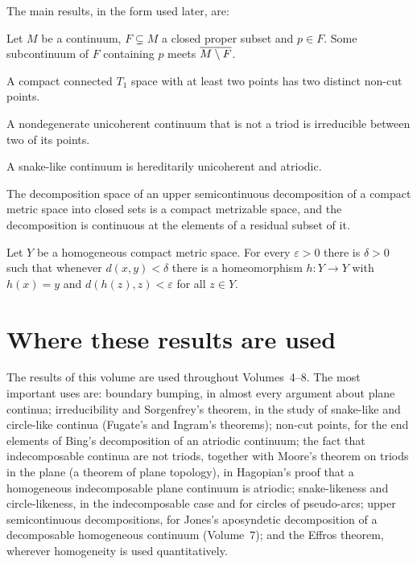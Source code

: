 The main results, in the form used later, are:

\begin{theorem}
Let $M$ be a continuum, $F\subsetneq M$ a closed proper subset and $p\in F$. Some subcontinuum of
$F$ containing $p$ meets $\overline{M\setminus F}$.
\end{theorem}

\begin{theorem}
A compact connected $T_1$ space with at least two points has two distinct non-cut points.
\end{theorem}

\begin{theorem}
A nondegenerate unicoherent continuum that is not a triod is irreducible between two of its
points.
\end{theorem}

\begin{theorem}
A snake-like continuum is hereditarily unicoherent and atriodic.
\end{theorem}

\begin{theorem}
The decomposition space of an upper semicontinuous decomposition of a compact metric space into
closed sets is a compact metrizable space, and the decomposition is continuous at the elements of
a residual subset of it.
\end{theorem}

\begin{theorem}
Let $Y$ be a homogeneous compact metric space. For every $\varepsilon>0$ there is $\delta>0$ such
that whenever $d(x,y)<\delta$ there is a homeomorphism $h\colon Y\to Y$ with $h(x)=y$ and
$d(h(z),z)<\varepsilon$ for all $z\in Y$.
\end{theorem}

\section{Where these results are used}

The results of this volume are used throughout Volumes~4--8. The most important uses are:
boundary bumping, in almost every argument about plane continua; irreducibility and Sorgenfrey's
theorem, in the study of snake-like and circle-like continua (Fugate's and Ingram's theorems);
non-cut points, for the end elements of Bing's decomposition of an atriodic continuum; the
fact that indecomposable continua are not triods, together with Moore's theorem on triods in the
plane (a theorem of plane topology), in Hagopian's proof that a homogeneous indecomposable plane continuum is
atriodic; snake-likeness and circle-likeness, in the indecomposable case and for circles of
pseudo-arcs; upper semicontinuous decompositions, for Jones's aposyndetic decomposition of a
decomposable homogeneous continuum (Volume~7); and the Effros theorem, wherever homogeneity is
used quantitatively.

